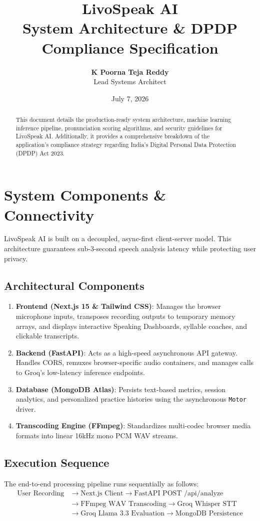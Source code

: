 \documentclass[11pt,a4paper]{article}
\title{\textbf{LivoSpeak AI \\ System Architecture \& DPDP Compliance Specification}}
\author{\textbf{K Poorna Teja Reddy} \\ Lead Systems Architect}
\date{July 7, 2026}
\begin{document}
\maketitle
\thispagestyle{empty}

\begin{abstract}
This document details the production-ready system architecture, machine learning inference pipeline, pronunciation scoring algorithms, and security guidelines for LivoSpeak AI. Additionally, it provides a comprehensive breakdown of the application's compliance strategy regarding India's Digital Personal Data Protection (DPDP) Act 2023.
\end{abstract}

\newpage

\section{System Components \& Connectivity}
LivoSpeak AI is built on a decoupled, async-first client-server model. This architecture guarantees sub-3-second speech analysis latency while protecting user privacy.

\subsection{Architectural Components}
\begin{enumerate}
    \item \textbf{Frontend (Next.js 15 \& Tailwind CSS)}: Manages the browser microphone inputs, transposes recording outputs to temporary memory arrays, and displays interactive Speaking Dashboards, syllable coaches, and clickable transcripts.
    \item \textbf{Backend (FastAPI)}: Acts as a high-speed asynchronous API gateway. Handles CORS, remuxes browser-specific audio containers, and manages calls to Groq's low-latency inference endpoints.
    \item \textbf{Database (MongoDB Atlas)}: Persists text-based metrics, session analytics, and personalized practice histories using the asynchronous \texttt{Motor} driver.
    \item \textbf{Transcoding Engine (FFmpeg)}: Standardizes multi-codec browser media formats into linear 16kHz mono PCM WAV streams.
\end{enumerate}

\subsection{Execution Sequence}
The end-to-end processing pipeline runs sequentially as follows:
\begin{align*}
\text{User Recording} &\longrightarrow \text{Next.js Client} \longrightarrow \text{FastAPI POST /api/analyze} \\
&\longrightarrow \text{FFmpeg WAV Transcoding} \longrightarrow \text{Groq Whisper STT} \\
&\longrightarrow \text{Groq Llama 3.3 Evaluation} \longrightarrow \text{MongoDB Persistence}
\end{align*}
\end{document}
